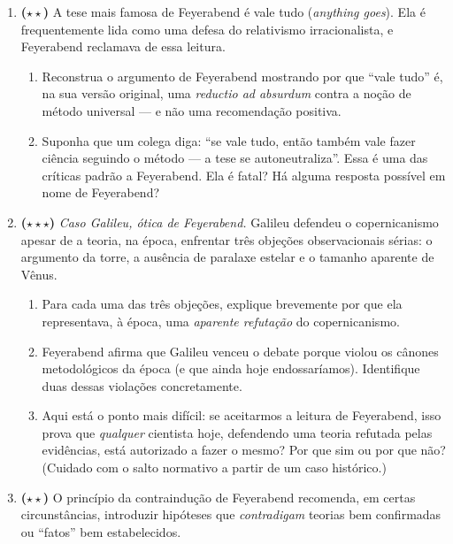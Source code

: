 \documentclass[10pt,a4paper]{extarticle}
\newcommand{\impt}[1]{\textcolor{important}{#1}}
\newcommand{\difii}{$\star\star$}
\newcommand{\difiii}{$\star\star\star$}
\begin{document}
\begin{enumerate}[label=\textbf{\arabic*.}, leftmargin=*, start=22]

\item \textbf{(\difii)} A tese mais famosa de Feyerabend é \impt{vale tudo} (\emph{anything goes}). Ela é frequentemente lida como uma defesa do relativismo irracionalista, e Feyerabend reclamava de essa leitura.

\begin{enumerate}[label=(\alph*)]
    \item Reconstrua o argumento de Feyerabend mostrando por que ``vale tudo'' é, na sua versão original, uma \emph{reductio ad absurdum} contra a noção de método universal --- e não uma recomendação positiva.
    \item Suponha que um colega diga: ``se vale tudo, então também vale fazer ciência seguindo o método --- a tese se autoneutraliza''. Essa é uma das críticas padrão a Feyerabend. Ela é fatal? Há alguma resposta possível em nome de Feyerabend?
\end{enumerate}

\item \textbf{(\difiii)} \emph{Caso Galileu, ótica de Feyerabend.} Galileu defendeu o copernicanismo apesar de a teoria, na época, enfrentar três objeções observacionais sérias: o argumento da torre, a ausência de paralaxe estelar e o tamanho aparente de Vênus.

\begin{enumerate}[label=(\alph*)]
    \item Para cada uma das três objeções, explique brevemente por que ela representava, à época, uma \emph{aparente refutação} do copernicanismo.
    \item Feyerabend afirma que Galileu venceu o debate porque \impt{violou} os cânones metodológicos da época (e que ainda hoje endossaríamos). Identifique duas dessas violações concretamente.
    \item Aqui está o ponto mais difícil: se aceitarmos a leitura de Feyerabend, isso prova que \emph{qualquer} cientista hoje, defendendo uma teoria refutada pelas evidências, está autorizado a fazer o mesmo? Por que sim ou por que não? (Cuidado com o salto normativo a partir de um caso histórico.)
\end{enumerate}

\item \textbf{(\difii)} O princípio da \impt{contraindução} de Feyerabend recomenda, em certas circunstâncias, introduzir hipóteses que \emph{contradigam} teorias bem confirmadas ou ``fatos'' bem estabelecidos.


\end{enumerate}
\end{document}
